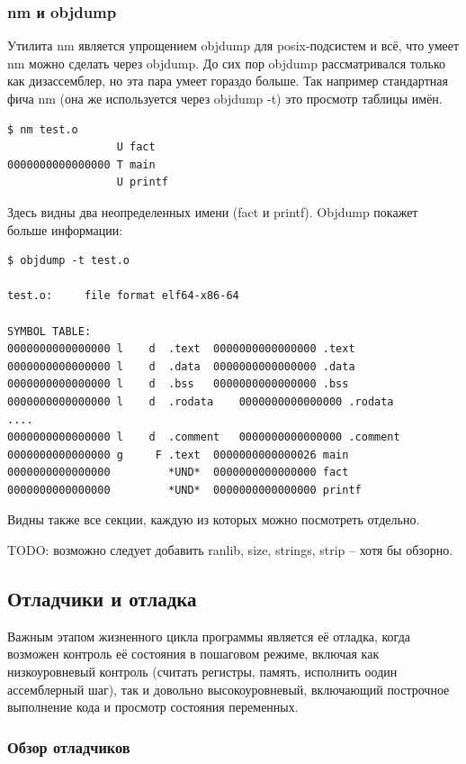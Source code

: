 \documentclass[a4paper,12pt,oneside]{article}
\begin{document}
\subsubsection{nm и objdump}

Утилита nm является упрощением objdump для posix-подсистем и всё, что умеет nm можно сделать через objdump. До сих пор objdump рассматривался только как дизассемблер, но эта пара умеет гораздо больше. Так например стандартная фича nm (она же используется через objdump -t) это просмотр таблицы имён.

\begin{verbatim}
$ nm test.o
                 U fact
0000000000000000 T main
                 U printf
\end{verbatim}

Здесь видны два неопределенных имени (fact и printf). Objdump покажет больше информации:

\begin{verbatim}
$ objdump -t test.o

test.o:     file format elf64-x86-64

SYMBOL TABLE:
0000000000000000 l    d  .text	0000000000000000 .text
0000000000000000 l    d  .data	0000000000000000 .data
0000000000000000 l    d  .bss	0000000000000000 .bss
0000000000000000 l    d  .rodata	0000000000000000 .rodata
....
0000000000000000 l    d  .comment	0000000000000000 .comment
0000000000000000 g     F .text	0000000000000026 main
0000000000000000         *UND*	0000000000000000 fact
0000000000000000         *UND*	0000000000000000 printf
\end{verbatim}

Видны также все секции, каждую из которых можно посмотреть отдельно.

TODO: возможно следует добавить ranlib, size, strings, strip -- хотя бы обзорно.

\subsection{Отладчики и отладка}\label{subsec:Debugger}

Важным этапом жизненного цикла программы является её отладка, когда возможен контроль её состояния в пошаговом режиме, включая как низкоуровневый контроль (считать регистры, память, исполнить оодин ассемблерный шаг), так и довольно высокоуровневый, включающий построчное выполнение кода и просмотр состояния переменных.

\subsubsection{Обзор отладчиков}\label{subsubsec:Overview}
\end{document}

